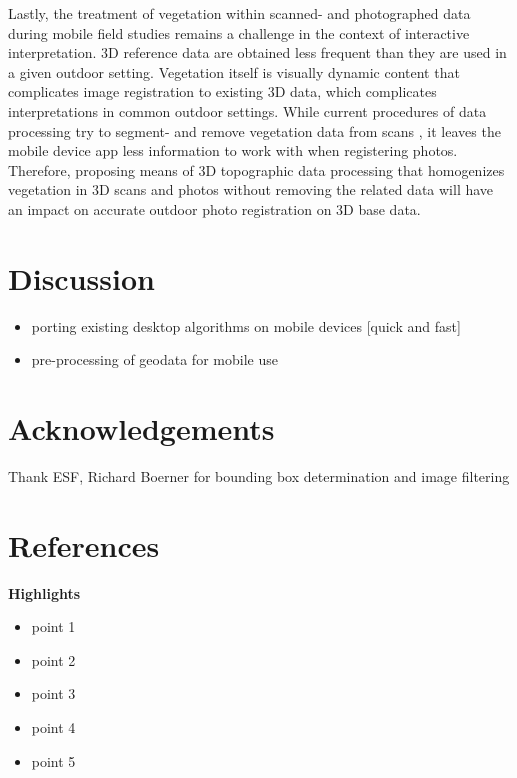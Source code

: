 \documentclass[review]{elsarticle}
\begin{document}
Lastly, the treatment of vegetation within scanned- and photographed data during mobile field studies remains a challenge in the context of interactive interpretation. 3D reference data are obtained less frequent than they are used in a given outdoor setting. Vegetation itself is visually dynamic content that complicates image registration to existing 3D data, which complicates interpretations in common outdoor settings. While current procedures of data processing try to segment- and remove vegetation data from scans \cite{}, it leaves the mobile device app less information to work with when registering photos. Therefore, proposing means of 3D topographic data processing that homogenizes vegetation in 3D scans and photos without removing the related data will have an impact on accurate outdoor photo registration on 3D base data.


\section{Discussion}
\label{sec:discussion}

\begin{itemize}
\item porting existing desktop algorithms on mobile devices [quick and fast]
\item pre-processing of geodata for mobile use
\end{itemize}

\section*{Acknowledgements}
Thank ESF, Richard Boerner for bounding box determination and image filtering

\section*{References}



\textbf{Highlights} \\
\begin{itemize}
\item point 1
\item point 2
\item point 3
\item point 4
\item point 5
\end{itemize}
\end{document}
